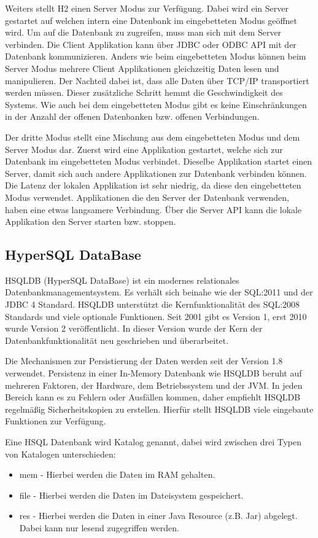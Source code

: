 \documentclass[draft,final]{vutinfth} %
\begin{document}
Weiters stellt H2 einen Server Modus zur Verfügung. Dabei wird ein Server gestartet auf welchen intern eine Datenbank im eingebetteten Modus geöffnet wird. Um auf die Datenbank zu zugreifen, muss man sich mit dem Server verbinden. Die Client Applikation kann über JDBC oder ODBC API mit der Datenbank kommunizieren. Anders wie beim eingebetteten Modus können beim Server Modus mehrere Client Applikationen gleichzeitig Daten lesen und manipulieren.
Der Nachteil dabei ist, dass alle Daten über TCP/IP transportiert werden müssen. Dieser zusätzliche Schritt hemmt die Geschwindigkeit des Systems. Wie auch bei dem eingebetteten Modus gibt es keine Einschränkungen in der Anzahl der offenen Datenbanken bzw. offenen Verbindungen.

Der dritte Modus stellt eine Mischung aus dem eingebetteten Modus und dem Server Modus dar. Zuerst wird eine Applikation gestartet, welche sich zur Datenbank im eingebetteten Modus verbindet. Dieselbe Applikation startet einen Server, damit sich auch andere Applikationen zur Datenbank verbinden können. Die Latenz der lokalen Applikation ist sehr niedrig, da diese den eingebetteten Modus verwendet. Applikationen die den Server der Datenbank verwenden, haben eine etwas langsamere Verbindung. Über die Server API kann die lokale Applikation den Server starten bzw. stoppen.

\cite{H2Adv}

\subsection{HyperSQL DataBase}
HSQLDB (HyperSQL DataBase) ist ein modernes relationales Datenbankmanagementsystem. Es verhält sich beinahe wie der SQL:2011 und der JDBC 4 Standard. HSQLDB unterstützt die Kernfunktionalität des SQL:2008 Standards und viele optionale Funktionen. Seit 2001 gibt es Version 1, erst 2010 wurde Version 2 veröffentlicht. In dieser Version wurde der Kern der Datenbankfunktionalität neu geschrieben und überarbeitet.

Die Mechanismen zur Persistierung der Daten werden seit der Version 1.8 verwendet. Persistenz in einer In-Memory Datenbank wie HSQLDB beruht auf mehreren Faktoren, der Hardware, dem Betriebssystem und der JVM. In jeden Bereich kann es zu Fehlern oder Ausfällen kommen, daher empfiehlt HSQLDB regelmä\ss ig Sicherheitskopien zu erstellen. Hierfür stellt HSQLDB viele eingebaute Funktionen zur Verfügung.

Eine HSQL Datenbank wird Katalog genannt, dabei wird zwischen drei Typen von Katalogen unterschieden:
\begin{itemize}
	\item mem - Hierbei werden die Daten im RAM gehalten.
	\item file - Hierbei werden die Daten im Dateisystem gespeichert.
	\item res - Hierbei werden die Daten in einer Java Resource (z.B. Jar) abgelegt. Dabei kann nur lesend zugegriffen werden.
\end{itemize}
\end{document}
